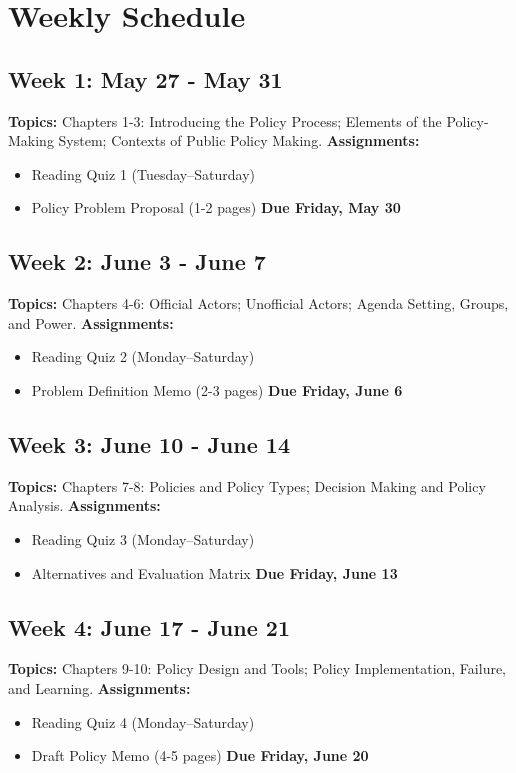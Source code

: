 \documentclass[11pt, letterpaper]{article}
\begin{document}
\section*{Weekly Schedule}

\subsection*{Week 1: May 27 - May 31}
\textbf{Topics:} \newline
Chapters 1-3: Introducing the Policy Process; Elements of the Policy-Making System; Contexts of Public Policy Making.\newline
\textbf{Assignments:} \begin{itemize}
  \item Reading Quiz 1 (Tuesday--Saturday)
  \item Policy Problem Proposal (1-2 pages) \textbf{Due Friday, May 30}
\end{itemize}

\subsection*{Week 2: June 3 - June 7}
\textbf{Topics:} \newline
Chapters 4-6: Official Actors; Unofficial Actors; Agenda Setting, Groups, and Power.\newline
\textbf{Assignments:} \begin{itemize}
  \item Reading Quiz 2 (Monday--Saturday)
  \item Problem Definition Memo (2-3 pages) \textbf{Due Friday, June 6}
\end{itemize}

\subsection*{Week 3: June 10 - June 14}
\textbf{Topics:} \newline
Chapters 7-8: Policies and Policy Types; Decision Making and Policy Analysis.\newline
\textbf{Assignments:} \begin{itemize}
  \item Reading Quiz 3 (Monday--Saturday)
  \item Alternatives and Evaluation Matrix \textbf{Due Friday, June 13}
\end{itemize}

\subsection*{Week 4: June 17 - June 21}
\textbf{Topics:} \newline
Chapters 9-10: Policy Design and Tools; Policy Implementation, Failure, and Learning.\newline
\textbf{Assignments:} \begin{itemize}
  \item Reading Quiz 4 (Monday--Saturday)
  \item Draft Policy Memo (4-5 pages) \textbf{Due Friday, June 20}
\end{itemize}
\end{document}
